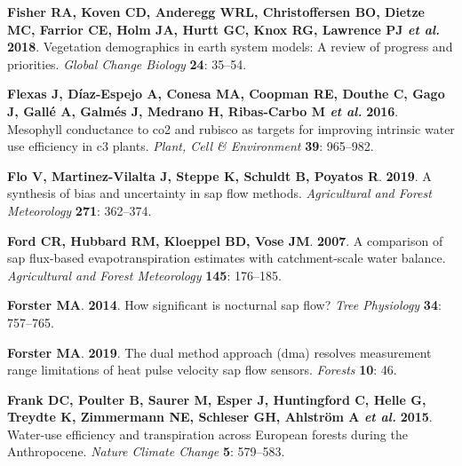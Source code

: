 \documentclass[11pt,twoside]{reedthesis}
\begin{document}
\hypertarget{ref-Fisher2018}{}
\textbf{\textnormal{Fisher RA}, \textnormal{Koven CD},
\textnormal{Anderegg WRL}, \textnormal{Christoffersen BO},
\textnormal{Dietze MC}, \textnormal{Farrior CE}, \textnormal{Holm JA},
\textnormal{Hurtt GC}, \textnormal{Knox RG}, \textnormal{Lawrence PJ}
\emph{et al.}} \textbf{2018}. Vegetation demographics in earth system
models: A review of progress and priorities. \emph{Global Change
Biology} \textbf{24}: 35--54.

\hypertarget{ref-Flexas2015}{}
\textbf{\textnormal{Flexas J}, \textnormal{Díaz-Espejo A},
\textnormal{Conesa MA}, \textnormal{Coopman RE}, \textnormal{Douthe C},
\textnormal{Gago J}, \textnormal{Gallé A}, \textnormal{Galmés J},
\textnormal{Medrano H}, \textnormal{Ribas-Carbo M} \emph{et al.}}
\textbf{2016}. Mesophyll conductance to co2 and rubisco as targets for
improving intrinsic water use efficiency in c3 plants. \emph{Plant, Cell
\& Environment} \textbf{39}: 965--982.

\hypertarget{ref-Flo2019}{}
\textbf{\textnormal{Flo V}, \textnormal{Martinez-Vilalta J},
\textnormal{Steppe K}, \textnormal{Schuldt B}, \textnormal{Poyatos R}}.
\textbf{2019}. A synthesis of bias and uncertainty in sap flow methods.
\emph{Agricultural and Forest Meteorology} \textbf{271}: 362--374.

\hypertarget{ref-Ford2007}{}
\textbf{\textnormal{Ford CR}, \textnormal{Hubbard RM},
\textnormal{Kloeppel BD}, \textnormal{Vose JM}}. \textbf{2007}. A
comparison of sap flux-based evapotranspiration estimates with
catchment-scale water balance. \emph{Agricultural and Forest
Meteorology} \textbf{145}: 176--185.

\hypertarget{ref-Forster2014}{}
\textbf{\textnormal{Forster MA}}. \textbf{2014}. How significant is
nocturnal sap flow? \emph{Tree Physiology} \textbf{34}: 757--765.

\hypertarget{ref-Forster_2019}{}
\textbf{\textnormal{Forster MA}}. \textbf{2019}. The dual method
approach (dma) resolves measurement range limitations of heat pulse
velocity sap flow sensors. \emph{Forests} \textbf{10}: 46.

\hypertarget{ref-Frank2015}{}
\textbf{\textnormal{Frank DC}, \textnormal{Poulter B},
\textnormal{Saurer M}, \textnormal{Esper J}, \textnormal{Huntingford C},
\textnormal{Helle G}, \textnormal{Treydte K}, \textnormal{Zimmermann
NE}, \textnormal{Schleser GH}, \textnormal{Ahlström A} \emph{et al.}}
\textbf{2015}. Water-use efficiency and transpiration across European
forests during the Anthropocene. \emph{Nature Climate Change}
\textbf{5}: 579--583.
\end{document}
